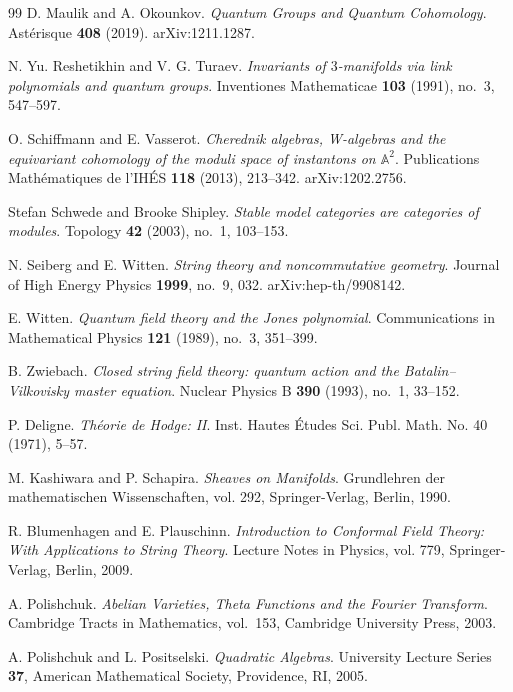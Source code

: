 \begin{thebibliography}{99}
D. Maulik and A. Okounkov.
\textit{Quantum Groups and Quantum Cohomology}.
Ast\'erisque \textbf{408} (2019).
arXiv:1211.1287.

N. Yu. Reshetikhin and V. G. Turaev.
\textit{Invariants of $3$-manifolds via link polynomials and quantum groups}.
Inventiones Mathematicae \textbf{103} (1991), no.~3, 547--597.

O. Schiffmann and E. Vasserot.
\textit{Cherednik algebras, W-algebras and the equivariant cohomology of the moduli space of instantons on $\mathbb{A}^2$}.
Publications Math\'ematiques de l'IH\'ES \textbf{118} (2013), 213--342.
arXiv:1202.2756.

Stefan Schwede and Brooke Shipley.
\textit{Stable model categories are categories of modules}.
Topology \textbf{42} (2003), no.~1, 103--153.

N. Seiberg and E. Witten.
\textit{String theory and noncommutative geometry}.
Journal of High Energy Physics \textbf{1999}, no.~9, 032.
arXiv:hep-th/9908142.

E. Witten.
\textit{Quantum field theory and the Jones polynomial}.
Communications in Mathematical Physics \textbf{121} (1989), no.~3, 351--399.

B. Zwiebach.
\textit{Closed string field theory: quantum action and the Batalin--Vilkovisky master equation}.
Nuclear Physics B \textbf{390} (1993), no.~1, 33--152.

P. Deligne.
\textit{Th\'eorie de Hodge: II}.
Inst. Hautes \'Etudes Sci. Publ. Math. No. 40 (1971), 5--57.

M. Kashiwara and P. Schapira.
\textit{Sheaves on Manifolds}.
Grundlehren der mathematischen Wissenschaften, vol. 292, Springer-Verlag, Berlin, 1990.

R. Blumenhagen and E. Plauschinn.
\textit{Introduction to Conformal Field Theory: With Applications to String Theory}.
Lecture Notes in Physics, vol. 779, Springer-Verlag, Berlin, 2009.

A. Polishchuk.
\textit{Abelian Varieties, Theta Functions and the Fourier Transform}.
Cambridge Tracts in Mathematics, vol.~153, Cambridge University Press, 2003.

A. Polishchuk and L. Positselski.
\textit{Quadratic Algebras}.
University Lecture Series \textbf{37}, American Mathematical Society, Providence, RI, 2005.


\end{thebibliography}
